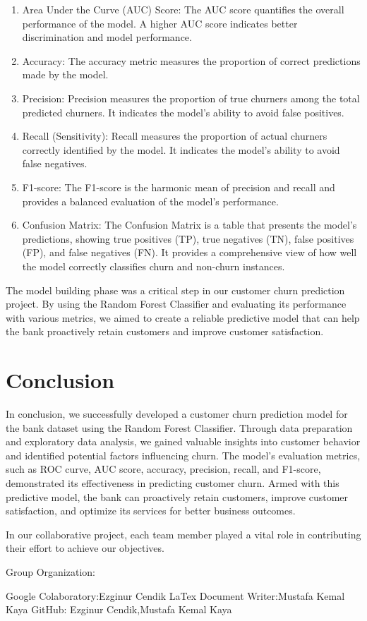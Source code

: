 \documentclass{article}
\begin{document}
\begin{multicols}{2}
\begin{enumerate}
    \item Area Under the Curve (AUC) Score: The AUC score quantifies the overall performance of the model. A higher AUC score indicates better discrimination and model performance.
    \item Accuracy: The accuracy metric measures the proportion of correct predictions made by the model.
    \item Precision: Precision measures the proportion of true churners among the total predicted churners. It indicates the model's ability to avoid false positives.
    \item Recall (Sensitivity): Recall measures the proportion of actual churners correctly identified by the model. It indicates the model's ability to avoid false negatives.
    \item F1-score: The F1-score is the harmonic mean of precision and recall and provides a balanced evaluation of the model's performance.
    \item Confusion Matrix: The Confusion Matrix is a table that presents the model's predictions, showing true positives (TP), true negatives (TN), false positives (FP), and false negatives (FN). It provides a comprehensive view of how well the model correctly classifies churn and non-churn instances.
\end{enumerate}

The model building phase was a critical step in our customer churn prediction project. By using the Random Forest Classifier and evaluating its performance with various metrics, we aimed to create a reliable predictive model that can help the bank proactively retain customers and improve customer satisfaction.

\section{Conclusion}

In conclusion, we successfully developed a customer churn prediction model for the bank dataset using the Random Forest Classifier. Through data preparation and exploratory data analysis, we gained valuable insights into customer behavior and identified potential factors influencing churn. The model's evaluation metrics, such as ROC curve, AUC score, accuracy, precision, recall, and F1-score, demonstrated its effectiveness in predicting customer churn. Armed with this predictive model, the bank can proactively retain customers, improve customer satisfaction, and optimize its services for better business outcomes.

In our collaborative project, each team member played a vital role in contributing their effort to achieve our objectives. 

Group Organization:

Google Colaboratory:Ezginur Cendik
LaTex Document Writer:Mustafa Kemal Kaya
GitHub: Ezginur Cendik,Mustafa Kemal Kaya





\end{multicols}
\end{document}
